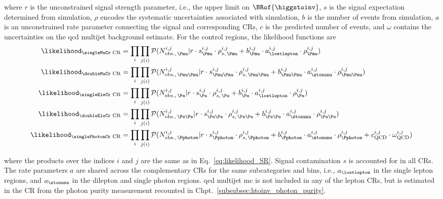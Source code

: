 where $r$ is the unconstrained signal strength parameter, i.e., the upper limit on $\BRof{\higgstoinv}$, $s$ is the signal expectation determined from simulation, $\rho$ encodes the systematic uncertainties associated with simulation, $b$ is the number of events from simulation, $a$ is an unconstrained rate parameter connecting the signal and corresponding \glspl{CR}, $c$ is the predicted number of events, and $\omega$ contains the uncertainties on the \acrshort{qcd} multijet background estimate. For the control regions, the likelihood functions are
\begin{equation}
    \begin{aligned}
\likelihood_{\text{\singleMuCr CR}} &= \prod_{i} \prod_{j(i)} \mathcal{P}( N_{\mathrm{obs.}, \, \Pmu }^{i, j} | r \cdot s^{i, j}_{\Pmu} \cdot \rho_{s,\, \Pmu}^{i, j} + b_{\Pmu}^{i, j} \cdot a_{\lostlepton}^{i, j} \cdot \rho_{\Pmu}^{i, j} )\\
\likelihood_{\text{\doubleMuCr CR}} &= \prod_{i} \prod_{j(i)} \mathcal{P}( N_{\mathrm{obs.}, \, \Pmu\Pmu }^{i, j} | r \cdot s^{i, j}_{\Pmu\Pmu} \cdot \rho_{s,\, \Pmu\Pmu}^{i, j} + b_{\Pmu\Pmu}^{i, j} \cdot a_{\ztonunu}^{i, j} \cdot \rho_{\Pmu\Pmu}^{i, j} )\\
\likelihood_{\text{\singleEleCr CR}} &= \prod_{i} \prod_{j(i)} \mathcal{P}( N_{\mathrm{obs.}, \, \Pe }^{i, j} | r \cdot s^{i, j}_{\Pe} \cdot \rho_{s,\, \Pe}^{i, j} + b_{\Pe}^{i, j} \cdot a_{\lostlepton}^{i, j} \cdot \rho_{\Pe}^{i, j} )\\
\likelihood_{\text{\doubleEleCr CR}} &= \prod_{i} \prod_{j(i)} \mathcal{P}( N_{\mathrm{obs.}, \, \Pe\Pe }^{i, j} | r \cdot s^{i, j}_{\Pe\Pe} \cdot \rho_{s,\, \Pe\Pe}^{i, j} + b_{\Pe\Pe}^{i, j} \cdot a_{\ztonunu}^{i, j} \cdot \rho_{\Pe\Pe}^{i, j} )\\
\likelihood_{\text{\singlePhotonCr CR}} &= \prod_{i} \prod_{j(i)} \mathcal{P}( N_{\mathrm{obs.}, \, \Pphoton }^{i, j} | r \cdot s^{i, j}_{\Pphoton} \cdot \rho_{s,\, \Pphoton}^{i, j} + b_{\Pphoton}^{i, j} \cdot a_{\ztonunu}^{i, j} \cdot \rho_{\Pphoton}^{i, j} + c_{\mathrm{QCD}}^{i, j} \cdot \omega_{\mathrm{QCD}}^{i, j} )
    \end{aligned}
    \label{eq:likelihood_CRs}
\end{equation}

where the products over the indices $i$ and $j$ are the same as in Eq.~\ref{eq:likelihood_SR}. Signal contamination $s$ is accounted for in all \glspl{CR}. The rate parameters $a$ are shared across the complementary \glspl{CR} for the same subcategories and \ptmiss bins, i.e., $a_{\lostlepton}$ in the single lepton regions, and $a_{\ztonunu}$ in the dilepton and single photon regions. \acrshort{qcd} multijet \acrshort{mc} is not included in any of the lepton \glspl{CR}, but is estimated in the \singlePhotonCr \gls{CR} from the photon purity measurement recounted in Chpt.~\ref{subsubsec:htoinv_photon_purity}.

